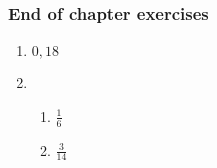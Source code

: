 {\begin{multicols}{3}
\begin{enumerate}[noitemsep, label=\textbf{\arabic*}. ]
\end{enumerate}
\subsubsection*{End of chapter exercises} %

\begin{enumerate}[noitemsep, label=\textbf{\arabic*}. ]
      \item $0,18$%

      \item %
	    \begin{enumerate}[itemsep=1pt, label=\textbf{(\alph*)} ]
		\item$\frac{1}{6}$ %
		\item$\frac{3}{14}$ %
	    \end{enumerate}


\end{enumerate}
\end{multicols}}
